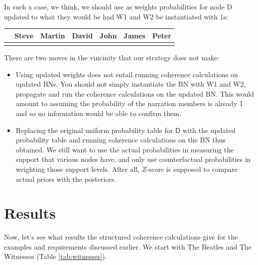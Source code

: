 \documentclass[10pt,]{scrartcl}
\begin{document}
In such a case, we think, we should use as weights  probabilities for node \textsf{D}  updated to what they would be had \textsf{W1} and \textsf{W2} be instantiated with 1s:

\begin{table}[H]
\centering
\begin{tabular}{lrrrrrr}
\toprule
  & Steve & Martin & David & John & James & Peter\\
\midrule
\cellcolor{gray!6}{Pr} & \cellcolor{gray!6}{0.981} & \cellcolor{gray!6}{0.004} & \cellcolor{gray!6}{0.004} & \cellcolor{gray!6}{0.004} & \cellcolor{gray!6}{0.004} & \cellcolor{gray!6}{0.004}\\
\bottomrule
\end{tabular}
\end{table}

\noindent  There are two moves in the vincinity that our strategy does not make:
\begin{itemize}

\item  Using updated weights does not entail running coherence calculations on updated BNs.  You should not simply instantiate the BN with \textsf{W1} and \textsf{W2}, propagate and run the coherence calculations on the updated BN. This would amount to assuming the probability of the narration members is already 1  and so no  information would be able to confirm them.

\item Replacing the original uniform probability table for $\mathsf{D}$ with the updated probability table and running coherence calculations on the BN thus obtained. We still want to use the actual probabilities in measuring the support  that various nodes have, and only use counterfactual probabilities in weighting those support levels. After all, $Z$-score is supposed to compare actual priors with the posteriors. 
\end{itemize}



\section{Results}\label{sec:Results}

Now, let's see what results the structured coherence calculations give for the examples and requirements discussed earlier. We start with \textsf{The Beatles} and \textsf{The Witnesses} (Table \ref{tab:witnesses}).
\end{document}
